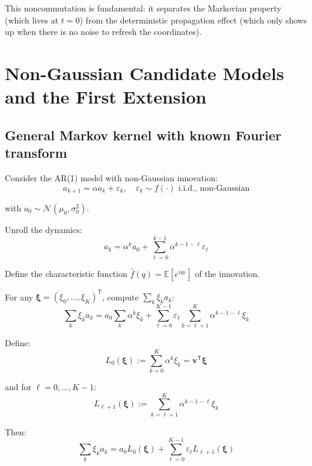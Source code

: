 \documentclass[11pt,a4paper]{article}
\theoremstyle{plain}
\theoremstyle{definition}
\newcommand{\vct}[1]{\mathbf{#1}}
\newcommand{\tr}{\mathsf{T}}
\begin{document}
This noncommutation is fundamental: it separates the Markovian property (which lives at $t=0$) from the deterministic propagation effect (which only shows up when there is no noise to refresh the coordinates).

\section{Non-Gaussian Candidate Models and the First Extension}
\label{sec:non-gaussian}

\subsection{General Markov kernel with known Fourier transform}
\label{sec:general-markov}

Consider the AR(1) model with non-Gaussian innovation:
\begin{equation}
a_{k+1} = \alpha a_k + \varepsilon_k, \quad \varepsilon_k \sim f(\cdot) \text{ i.i.d., non-Gaussian}
\end{equation}

with $a_0 \sim \mathcal{N}(\mu_0, \sigma_0^2)$.

Unroll the dynamics:
\begin{equation}
a_k = \alpha^k a_0 + \sum_{\ell=0}^{k-1} \alpha^{k-1-\ell}\varepsilon_\ell
\end{equation}

Define the characteristic function $\hat{f}(q) = \mathbb{E}[e^{iq\varepsilon}]$ of the innovation.

For any $\boldsymbol{\xi} = (\xi_0, \ldots, \xi_K)^\tr$, compute $\sum_k \xi_k a_k$:
\begin{equation}
\sum_k \xi_k a_k = a_0 \sum_k \alpha^k \xi_k + \sum_{\ell=0}^{K-1}\varepsilon_\ell \sum_{k=\ell+1}^K \alpha^{k-1-\ell}\xi_k
\end{equation}

Define:
\begin{equation}
L_0(\boldsymbol{\xi}) := \sum_{k=0}^K \alpha^k \xi_k = \vct{v}^\tr \boldsymbol{\xi}
\end{equation}

and for $\ell = 0, \ldots, K-1$:
\begin{equation}
L_{\ell+1}(\boldsymbol{\xi}) := \sum_{k=\ell+1}^K \alpha^{k-1-\ell}\xi_k
\end{equation}

Then:
\begin{equation}
\sum_k \xi_k a_k = a_0 L_0(\boldsymbol{\xi}) + \sum_{\ell=0}^{K-1}\varepsilon_\ell L_{\ell+1}(\boldsymbol{\xi})
\end{equation}
\end{document}
